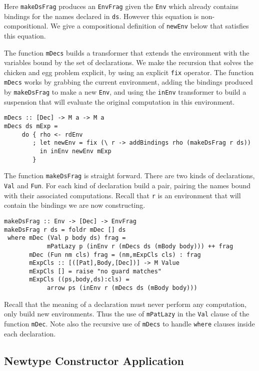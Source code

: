 \documentclass{entcs} \usepackage{entcsmacro}
\begin{document}
{Here {\tt makeDsFrag} produces an {\tt EnvFrag} given the {\tt Env} which
already contains bindings for the names declared in {\tt ds}. However this
equation is non-compositional. We give a compositional definition of {\tt newEnv}
below that satisfies this equation.

The function {\tt mDecs} builds a transformer that extends the environment with the
variables bound by the set of declarations. We make the recursion that solves the
chicken and egg problem explicit, by using an explicit {\tt fix} operator. The function
{\tt mDecs} works by grabbing the current environment, adding the bindings produced by
{\tt makeDsFrag} to make a new {\tt Env}, and using the {\tt inEnv} transformer to build
a suspension that will evaluate the original computation in this environment.

{\small
\begin{verbatim}
mDecs :: [Dec] -> M a -> M a
mDecs ds mExp =
     do { rho <- rdEnv
        ; let newEnv = fix (\ r -> addBindings rho (makeDsFrag r ds))
          in inEnv newEnv mExp
        }
\end{verbatim}
}               

The function {\tt makeDsFrag} is straight forward. There are two kinds of declarations,
{\tt Val} and {\tt Fun}. For each kind of declaration build a pair, pairing the names
bound with their associated computations. Recall that {\tt r} is an environment that
will contain the bindings we are now constructing.


{\small
\begin{verbatim}
makeDsFrag :: Env -> [Dec] -> EnvFrag
makeDsFrag r ds = foldr mDec [] ds
 where mDec (Val p body ds) frag = 
            mPatLazy p (inEnv r (mDecs ds (mBody body))) ++ frag
       mDec (Fun nm cls) frag = (nm,mExpCls cls) : frag
       mExpCls :: [([Pat],Body,[Dec])] -> M Value
       mExpCls [] = raise "no guard matches"
       mExpCls ((ps,body,ds):cls) = 
            arrow ps (inEnv r (mDecs ds (mBody body)))  
\end{verbatim}
}

Recall that the meaning of a declaration must never perform any computation,
only build new environments. Thus the use of {\tt mPatLazy} in the {\tt Val}
clause of the function {\tt mDec}. Note also the recursive use of {\tt mDecs}
to handle {\tt where} clauses inside each declaration.


\subsection{Newtype Constructor Application}

}
\end{document}
